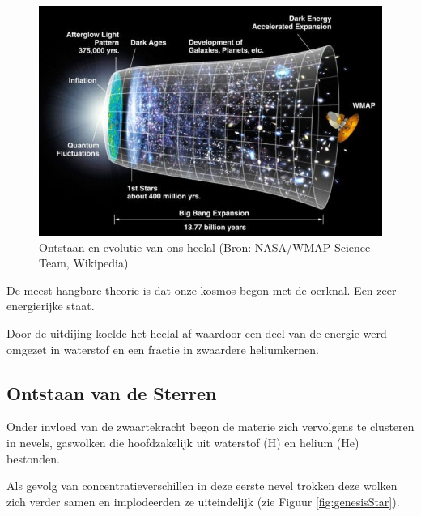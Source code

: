 \documentclass[
  11pt,
]{book}
\begin{document}
\begin{figure}

{\centering \includegraphics[width=1\linewidth]{./figs/originKosmos} 

}

\caption{Ontstaan ​​en evolutie van ons heelal (Bron: NASA/WMAP Science Team, Wikipedia)}\label{fig:evolutionUniverse}
\end{figure}

De meest hangbare theorie is dat onze kosmos begon met de oerknal. Een zeer energierijke staat.

Door de uitdijing koelde het heelal af waardoor een deel van de energie werd omgezet in waterstof en een fractie in zwaardere heliumkernen.

\hypertarget{ontstaan-van-de-sterren}{%
\subsection{Ontstaan van de Sterren}\label{ontstaan-van-de-sterren}}

Onder invloed van de zwaartekracht begon de materie zich vervolgens te clusteren in nevels, gaswolken die hoofdzakelijk uit waterstof (H) en helium (He) bestonden.

Als gevolg van concentratieverschillen in deze eerste nevel trokken deze wolken zich verder samen en implodeerden ze uiteindelijk (zie Figuur \ref{fig:genesisStar}).
\end{document}
